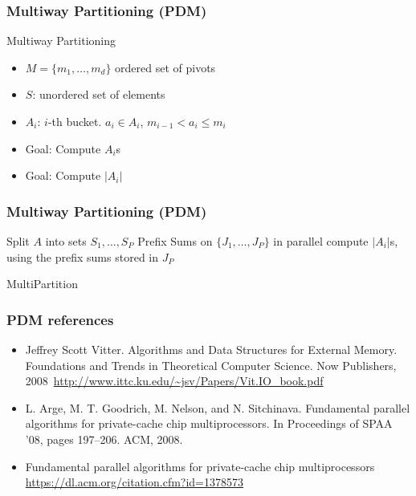\documentclass[12pt,aspectratio=169]{beamer}
\begin{document}
  \begin{frame}\frametitle{Multiway Partitioning (PDM)}
  \begin{block}{Multiway Partitioning}
    \begin{itemize}
    \item
      $M=\{ m_{1}, \ldots , m_{d}\}$ ordered set of pivots
    \item
      $S$: unordered set of elements
    \item
      $A_{i}$: $i$-th bucket. $a_{i}\in A_{i}$, $m_{i-1}< a_{i} \le m_{i}$
    \item
      Goal: Compute $A_{i}$s
    \item
      Goal: Compute $|A_{i}|$
    \end{itemize}
  \end{block}
\end{frame}

\begin{frame}\frametitle{Multiway Partitioning (PDM)}
  \begin{algorithm}[H]
    Split $A$ into sets $S_{1}, \ldots , S_{P}$\;
    Prefix Sums on $\{J_{1}, \ldots , J_{P}\}$ in parallel\;
    compute $|A_{i}|$s, using the prefix sums stored in $J_{P}$
    \caption{MultiPartition}
  \end{algorithm}
\end{frame}

\begin{frame}\frametitle{PDM references}
  \small
  \begin{itemize}
    \item
Jeffrey Scott Vitter.
Algorithms and Data Structures for External Memory.
Foundations and Trends in Theoretical Computer Science.
Now Publishers, 2008~\url{http://www.ittc.ku.edu/~jsv/Papers/Vit.IO_book.pdf}
\item
L. Arge, M. T. Goodrich, M. Nelson, and N. Sitchinava. Fundamental
parallel algorithms for private-cache chip multiprocessors. In Proceedings
of SPAA ’08, pages 197–206. ACM, 2008.
\item
  Fundamental parallel algorithms for private-cache chip multiprocessors
\url{https://dl.acm.org/citation.cfm?id=1378573}
\end{itemize}
\end{frame}
\end{document}
